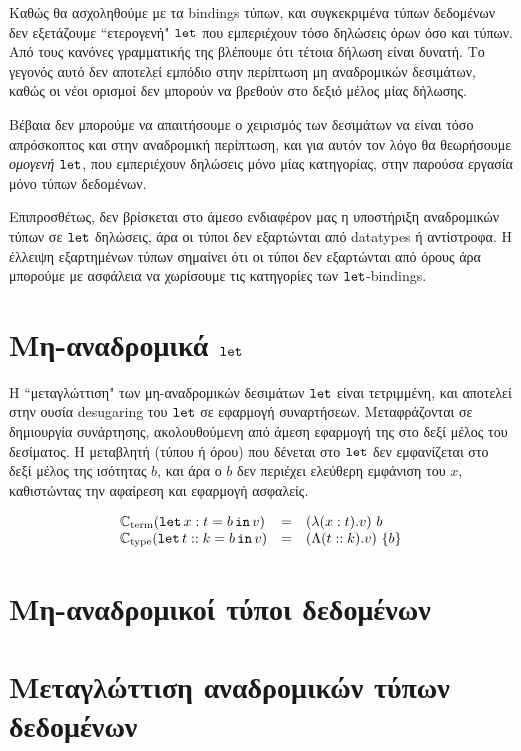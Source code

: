 \documentclass[diploma]{softlab-thesis}
\begin{document}
Καθώς θα ασχοληθούμε με τα bindings τύπων, και συγκεκριμένα τύπων δεδομένων δεν εξετάζουμε
``ετερογενή" $\operatorname{\texttt{let}}$ που εμπεριέχουν τόσο δηλώσεις όρων όσο και τύπων. Από τους κανόνες
γραμματικής της \FIR{} βλέπουμε ότι τέτοια δήλωση είναι δυνατή. Το γεγονός αυτό δεν αποτελεί
εμπόδιο στην περίπτωση μη αναδρομικών δεσιμάτων, καθώς οι νέοι ορισμοί δεν μπορούν να βρεθούν
στο δεξιό μέλος μίας δήλωσης.

Βέβαια δεν μπορούμε να απαιτήσουμε ο χειρισμός των δεσιμάτων να είναι τόσο απρόσκοπτος και στην
αναδρομική περίπτωση, και για αυτόν τον λόγο θα θεωρήσουμε \emph{ομογενή} $\operatorname{\texttt{let}}$, που εμπεριέχουν
δηλώσεις μόνο μίας κατηγορίας, στην παρούσα εργασία μόνο τύπων δεδομένων.

Επιπροσθέτως, δεν βρίσκεται στο άμεσο ενδιαφέρον μας η υποστήριξη αναδρομικών τύπων σε $\operatorname{\texttt{let}}$
δηλώσεις, άρα οι τύποι δεν εξαρτώνται από datatypes ή αντίστροφα. Η έλλειψη εξαρτημένων τύπων
σημαίνει ότι οι τύποι δεν εξαρτώνται από όρους άρα μπορούμε με ασφάλεια να χωρίσουμε τις κατηγορίες
των $\operatorname{\texttt{let}}$-bindings.

\section{Μη-αναδρομικά $\operatorname{\texttt{let}}$}
%
Η ``μεταγλώττιση" των μη-αναδρομικών δεσιμάτων $\operatorname{\texttt{let}}$ είναι τετριμμένη, και αποτελεί στην ουσία
desugaring του $\operatorname{\texttt{let}}$ σε εφαρμογή συναρτήσεων. Μεταφράζονται σε δημιουργία συνάρτησης, ακολουθούμενη από άμεση εφαρμογή της στο δεξί μέλος του δεσίματος. Η μεταβλητή (τύπου ή όρου)
που δένεται στο $\operatorname{\texttt{let}}$ δεν εμφανίζεται στο δεξί μέλος της ισότητας $b$, και άρα ο $b$ δεν περιέχει
ελεύθερη εμφάνιση του $x$, καθιστώντας την αφαίρεση και εφαρμογή ασφαλείς.

  \begin{displaymath}
    \begin{array}{lll}
    \mathbb{C}_{\mathrm{term}}(\operatorname{\texttt{let}} x : t = b \operatorname{\texttt{in}} v) &=& (\lambda (x : t) . v)\ b\\
    \mathbb{C}_{\mathrm{type}}(\operatorname{\texttt{let}} t :: k = b \operatorname{\texttt{in}} v) &=& (\Lambda (t :: k) . v)\ \{b\}
    \end{array}
  \end{displaymath}


\section{Μη-αναδρομικοί τύποι δεδομένων}
\label{sec:non-recursive-data}



\section{Μεταγλώττιση αναδρομικών τύπων δεδομένων}
\label{sec:compile-recursive-datatypes}

\end{document}
